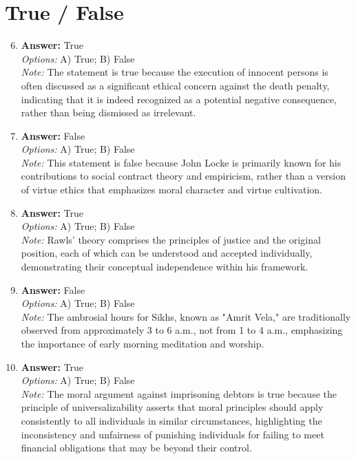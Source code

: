 \documentclass[12pt]{article}
\begin{document}
\section*{True / False}
\begin{enumerate}[label=\arabic*.]
\setcounter{enumi}{5}
\item \textbf{Answer:} True
\\ \textit{Options:} A) True; B) False
\\ \textit{Note:} The statement is true because the execution of innocent persons is often discussed as a significant ethical concern against the death penalty, indicating that it is indeed recognized as a potential negative consequence, rather than being dismissed as irrelevant.
\item \textbf{Answer:} False
\\ \textit{Options:} A) True; B) False
\\ \textit{Note:} This statement is false because John Locke is primarily known for his contributions to social contract theory and empiricism, rather than a version of virtue ethics that emphasizes moral character and virtue cultivation.
\item \textbf{Answer:} True
\\ \textit{Options:} A) True; B) False
\\ \textit{Note:} Rawls' theory comprises the principles of justice and the original position, each of which can be understood and accepted individually, demonstrating their conceptual independence within his framework.
\item \textbf{Answer:} False
\\ \textit{Options:} A) True; B) False
\\ \textit{Note:} The ambrosial hours for Sikhs, known as "Amrit Vela," are traditionally observed from approximately 3 to 6 a.m., not from 1 to 4 a.m., emphasizing the importance of early morning meditation and worship.
\item \textbf{Answer:} True
\\ \textit{Options:} A) True; B) False
\\ \textit{Note:} The moral argument against imprisoning debtors is true because the principle of universalizability asserts that moral principles should apply consistently to all individuals in similar circumstances, highlighting the inconsistency and unfairness of punishing individuals for failing to meet financial obligations that may be beyond their control.
\end{enumerate}
\end{document}
